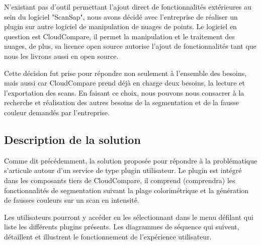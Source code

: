 \documentclass[12pt,titlepage,french]{article}
\begin{document}
N'existant pas d'outil permettant l'ajout direct de fonctionnalités extérieures au sein du logiciel "ScanSap", nous avons décidé avec l'entreprise de réaliser un plugin sur autre logiciel de manipulation de nuages de points. Le logiciel en question est CloudCompare, il permet la manipulation et le traitement des nuages, de plus, sa licence open source autorise l'ajout de fonctionnalités tant que nous les livrons aussi en open source. \newline

Cette décision fut prise pour répondre non seulement à l'ensemble des besoins, mais aussi car CloudCompare prend déjà en charge deux besoins, la lecture et l'exportation des scans. En faisant ce choix, nous pouvons nous consacrer à la recherche et réalisation des autres besoins de la segmentation et de la fausse couleur demandés par l'entreprise.


\newpage
\subsection{Description de la solution}
Comme dit précédemment, la solution proposée pour répondre à la problématique s'articule autour d'un service de type plugin utilisateur. Le plugin est intégré dans les composants tiers de CloudCompare, il comprend (comprendra) les fonctionnalités de segmentation suivant la plage colorimétrique et la génération de fausses couleurs sur un scan en intensité. \newline

Les utilisateurs pourront y accéder en les sélectionnant dans le menu défilant qui liste les différents plugins présents. Les diagrammes de séquence qui suivent, détaillent et illustrent le fonctionnement de l'expérience utilisateur.
\end{document}

